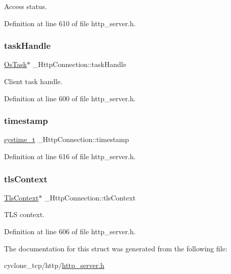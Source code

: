 Access status. 



Definition at line 610 of file http\+\_\+server.\+h.

\mbox{\label{struct__HttpConnection_ac671abf4639711c2737694e8b0190bda}} 
\subsubsection{\texorpdfstring{task\+Handle}{taskHandle}}
{\footnotesize\ttfamily \hyperlink{structOsTask}{Os\+Task}$\ast$ \+\_\+\+Http\+Connection\+::task\+Handle}



Client task handle. 



Definition at line 600 of file http\+\_\+server.\+h.

\mbox{\label{struct__HttpConnection_aec53535a46fe290578e39b9fae8cba46}} 
\subsubsection{\texorpdfstring{timestamp}{timestamp}}
{\footnotesize\ttfamily \hyperlink{compiler__port_8h_ae3e32a98d431a02106616da3071832dd}{systime\+\_\+t} \+\_\+\+Http\+Connection\+::timestamp}



Definition at line 616 of file http\+\_\+server.\+h.

\mbox{\label{struct__HttpConnection_adf158830c8a41b5b3e1f9f632e93b01f}} 
\subsubsection{\texorpdfstring{tls\+Context}{tlsContext}}
{\footnotesize\ttfamily \hyperlink{tls_8h_ac09f7a286c0cdf9b07ee1edd107946f5}{Tls\+Context}$\ast$ \+\_\+\+Http\+Connection\+::tls\+Context}



T\+LS context. 



Definition at line 606 of file http\+\_\+server.\+h.



The documentation for this struct was generated from the following file\+:\begin{DoxyCompactItemize}
\item 
cyclone\+\_\+tcp/http/\hyperlink{http__server_8h}{http\+\_\+server.\+h}\end{DoxyCompactItemize}
